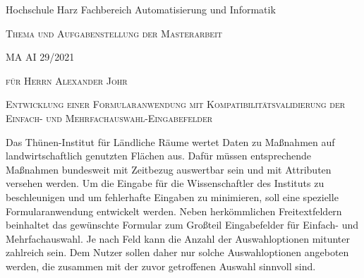 
\newpage
\thispagestyle{empty}

Hochschule Harz\newline
Fachbereich Automatisierung und Informatik
\vfill
\begin{center}

\large{\textsc{Thema und Aufgabenstellung der Masterarbeit}}

\large{\textsc{MA AI 29/2021}}

\vfill

\large{\textsc{für Herrn Alexander Johr}}

\vfill

\Large{\textsc{Entwicklung einer Formularanwendung mit Kompatibilitätsvalidierung der Einfach- und Mehrfachauswahl-Eingabefelder}}



\end{center}

\vfill



















Das Thünen-Institut für Ländliche Räume wertet Daten zu Maßnahmen auf landwirtschaftlich genutzten Flächen aus. Dafür müssen entsprechende Maßnahmen
bundesweit mit Zeitbezug auswertbar sein und mit Attributen versehen werden.
Um die Eingabe für die Wissenschaftler des Instituts zu beschleunigen
 und um fehlerhafte Eingaben zu minimieren, soll eine 
 spezielle Formularanwendung entwickelt werden.
Neben herkömmlichen Freitextfeldern beinhaltet das gewünschte Formular zum Großteil Eingabefelder für Einfach- und Mehrfachauswahl.
Je nach Feld kann die Anzahl der Auswahloptionen mitunter zahlreich sein.
Dem Nutzer sollen daher nur solche Auswahloptionen angeboten werden,
die zusammen mit der zuvor getroffenen Auswahl sinnvoll sind.

